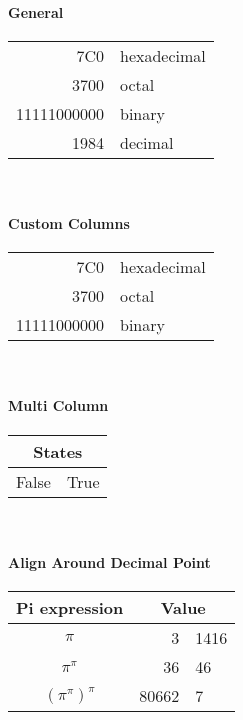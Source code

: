 \documentclass[a4paper,11pt]{article}
\begin{document}
\paragraph{General}
\begin{center}
\begin{tabular}{|r|l|}
	\hline
	7C0 & hexadecimal \\ \cline{1-1}
	3700 & octal \\ \cline{2-2}
	11111000000 & binary \\
	\hline \hline
	1984 & decimal \\
	\hline
\end{tabular}
\end{center}
\mbox{}\\
\paragraph{Custom Columns}
\begin{center}
\begin{tabular}{@{} r @{~~} l @{}}
	\hline
	7C0 & hexadecimal \\
	3700 & octal \\
	11111000000 & binary \\
	\hline
\end{tabular}
\end{center}

\mbox{}\\
\paragraph{Multi Column}
\begin{center}
\begin{tabular}{|c|c|}
	\hline
	\multicolumn{2}{|c|}{States} \\
	\hline
	False & True \\
	\hline
\end{tabular}
\end{center}

\mbox{}\\
\paragraph{Align Around Decimal Point}
\begin{center}
	\begin{tabular}{c r @{.} l}
		Pi expression
		&
		\multicolumn{2}{c}{Value} \\
		\hline
		$\pi$
		& 3&1416 \\
		$\pi^{\pi}$
		& 36&46
		\\
		$(\pi^{\pi})^{\pi}$ & 80662&7 \\
	\end{tabular}
\end{center}
\end{document}

